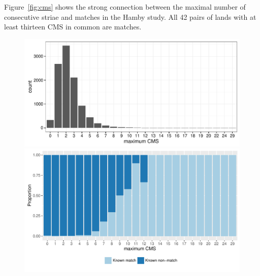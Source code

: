 \documentclass[aoas, preprint]{imsart}\usepackage[]{graphicx}\usepackage[]{color}
\newenvironment{knitrout}{}{} %
\begin{document}
Figure~\ref{fig:cms} shows the strong connection between the maximal number of consecutive striae and matches in the Hamby study. All 42 pairs of lands with at least thirteen CMS in common are matches. 
%
\begin{figure}[hbtp]
  \centering
\begin{minipage}[t]{.47\textwidth}
\begin{knitrout}
\color{fgcolor}
\includegraphics[width=\textwidth]{cms-bars-1} 

\end{knitrout}
\end{minipage}
\begin{minipage}[t]{.52\textwidth}
\begin{knitrout}
\color{fgcolor}
\includegraphics[width=\textwidth]{cms-spines-1} 


\end{knitrout}
\end{minipage}
\end{figure}
\end{document}
